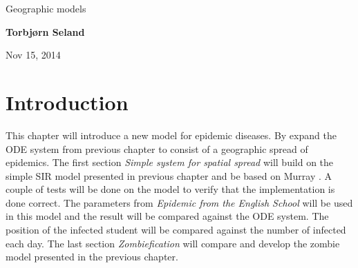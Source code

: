 \documentclass[%
twoside,                 %
final,                   %
10pt]{article}
\begin{document}






\thispagestyle{empty}

\begin{center}
{\LARGE\bf
\begin{spacing}{1.25}
Geographic models 
\end{spacing}
}
\end{center}


\begin{center}
{\bf Torbjørn Seland${}^{}$} \\ [0mm]
\end{center}

    \begin{center}
\end{center}


\begin{center}
Nov 15, 2014
\end{center}

\vspace{1cm}


\tableofcontents


\vspace{1cm} %




\section{Introduction}
This chapter will introduce a new model for epidemic diseases. By expand the ODE system from previous chapter to consist of a geographic spread of epidemics. The first section \emph{Simple system for spatial spread} will build on the simple SIR model presented in previous chapter and be based on Murray \cite{murray2003mathematical}. A couple of tests will be done on the model to verify that the implementation is done correct. The parameters from \emph{Epidemic from the English School} will be used in this model and the result will be compared against the ODE system. The position of the infected student will be compared against the number of infected each day. The last section \emph{Zombiefication} will compare and develop the zombie model presented in the previous chapter.
\end{document}
